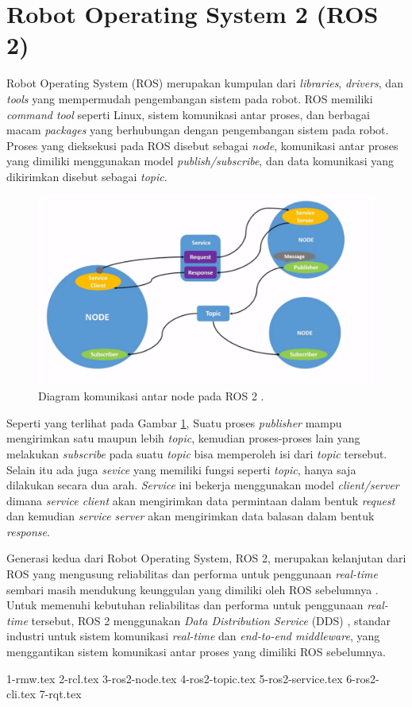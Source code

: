 \section{Robot Operating System 2 (ROS 2)}
\label{sec:ros2}

Robot Operating System (ROS) \citep{cit:quigley2009} merupakan kumpulan dari \emph{libraries}, \emph{drivers}, dan \emph{tools} yang mempermudah pengembangan sistem pada robot.
ROS memiliki \emph{command tool} seperti Linux, sistem komunikasi antar proses, dan berbagai macam \emph{packages} yang berhubungan dengan pengembangan sistem pada robot.
Proses yang dieksekusi pada ROS disebut sebagai \emph{node}, komunikasi antar proses yang dimiliki menggunakan model \emph{publish/subscribe}, dan data komunikasi yang dikirimkan disebut sebagai \emph{topic}.

\begin{figure} [ht]
  \centering
	\includegraphics[scale=0.4]{gambar/komunikasi-ros.png}
	\caption{Diagram komunikasi antar node pada ROS 2 \citep{url:ros2nodes}.}
	\label{fig:komunikasiros}
\end{figure}

Seperti yang terlihat pada Gambar \ref{fig:komunikasiros}, Suatu proses \emph{publisher} mampu mengirimkan satu maupun lebih \emph{topic}, kemudian proses-proses lain yang melakukan \emph{subscribe} pada suatu \emph{topic} bisa memperoleh isi dari \emph{topic} tersebut.
Selain itu ada juga \emph{sevice} yang memiliki fungsi seperti \emph{topic}, hanya saja dilakukan secara dua arah.
\emph{Service} ini bekerja menggunakan model \emph{client/server} dimana \emph{service client} akan mengirimkan data permintaan dalam bentuk \emph{request} dan kemudian \emph{service server} akan mengirimkan data balasan dalam bentuk \emph{response}.

Generasi kedua dari Robot Operating System, ROS 2, merupakan kelanjutan dari ROS yang mengusung reliabilitas dan performa untuk penggunaan \emph{real-time} sembari masih mendukung keunggulan yang dimiliki oleh ROS sebelumnya \citep{cit:maruyama2016}.
Untuk memenuhi kebutuhan reliabilitas dan performa untuk penggunaan \emph{real-time} tersebut, ROS 2 menggunakan \emph{Data Distribution Service} (DDS) \citep{cit:castellote2003} \citep{cit:schlesselman2004}, standar industri untuk sistem komunikasi \emph{real-time} dan \emph{end-to-end middleware}, yang menggantikan sistem komunikasi antar proses yang dimiliki ROS sebelumnya.

{1-rmw.tex}
{2-rcl.tex}
{3-ros2-node.tex}
{4-ros2-topic.tex}
{5-ros2-service.tex}
{6-ros2-cli.tex}
{7-rqt.tex}
